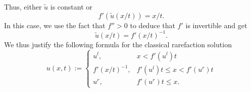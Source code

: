 \begin{enumerate}
Thus, either $\tilde u$ is constant or
\begin{equation}\label{eq:scalar-rarefaction-speed-value}
f'(\tilde u(x/t))=x/t.
\end{equation}
In this case, we use the fact that $f''>0$ to deduce that $f'$ is invertible and get
\begin{equation}\label{eq:scalar-rarefaction-source-inverse-notation}
\tilde u(x/t)=f'(x/t)^{-1}.
\end{equation}
We thus justify the following formula for the classical rarefaction solution
\begin{equation}\label{eq:scalar-riemann-classical-rarefaction}
u(x,t):=\begin{cases}u^l,&x<f'(u^l)t\\f'(x/t)^{-1},&f'(u^l)t\leq x<f'(u^r)t\\u^r,&f'(u^r)t\leq x.\end{cases}
\end{equation}
\end{enumerate}
